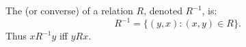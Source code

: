 The  (or converse) of a relation $R$, denoted $R^{-1}$, is:
$$
R^{-1} = \{(y,x): (x,y) \in R\}.
$$
Thus $x R^{-1} y$ iff $y R x$.
